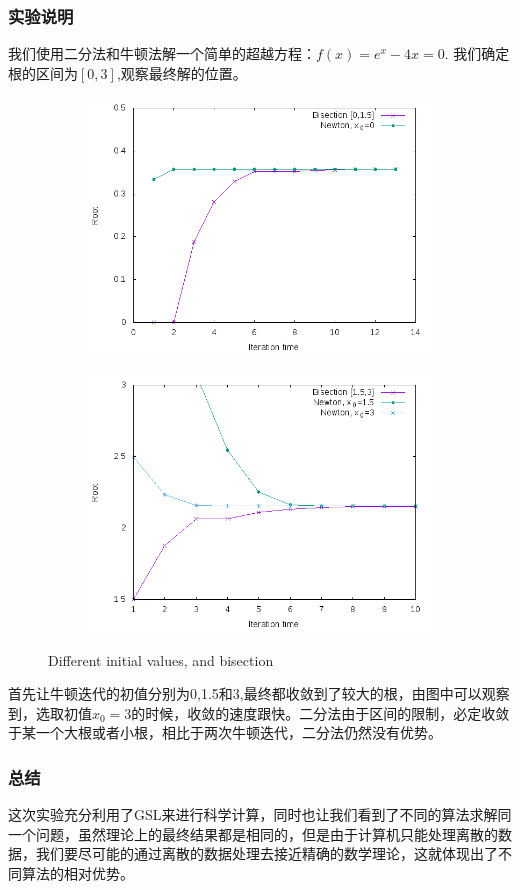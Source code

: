 \documentclass{beamer}
\begin{document}
\begin{frame}
\frametitle{实验说明}
我们使用二分法和牛顿法解一个简单的超越方程：$f(x)=e^x-4x=0$.
我们确定根的区间为$[0,3]$,观察最终解的位置。
\begin{figure}[H]
  \begin{subfigure}{0.2\linewidth}
  \centering
  \includegraphics[width=1\textwidth]{graph4.png}
  \end{subfigure}
  \begin{subfigure}{0.2\linewidth}
  \centering
  \includegraphics[width=1\textwidth]{graph5.png}
  \end{subfigure}
  \caption{Different initial values, and bisection}
\end{figure}

首先让牛顿迭代的初值分别为0,1.5和3,最终都收敛到了较大的根，由图中可以观察到，选取初值$x_0=3$的时候，收敛的速度跟快。二分法由于区间的限制，必定收敛于某一个大根或者小根，相比于两次牛顿迭代，二分法仍然没有优势。
\end{frame}

\begin{frame}
\frametitle{总结}
这次实验充分利用了GSL来进行科学计算，同时也让我们看到了不同的算法求解同一个问题，虽然理论上的最终结果都是相同的，但是由于计算机只能处理离散的数据，我们要尽可能的通过离散的数据处理去接近精确的数学理论，这就体现出了不同算法的相对优势。
\end{frame}
\end{document}
